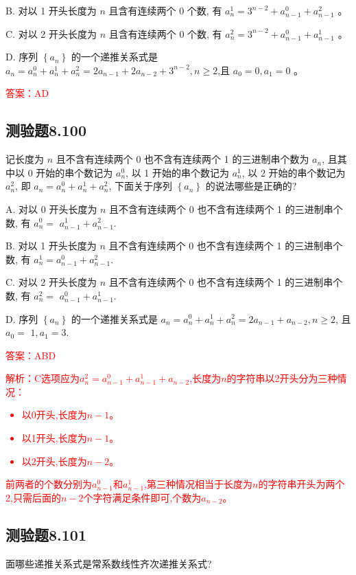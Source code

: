 \documentclass[UTF8, heading=true]{ctexart}
\begin{document}
B. 对以 1 开头长度为 $n$ 且含有连续两个 0 个数, 有 $a_n^1=3^{n-2}+a_{n-1}^0+a_{n-1}^2$ 。

C. 对以 2 开头长度为 $n$ 且含有连续两个 0 个数, 有 $a_n^2=3^{n-2}+a_{n-1}^0+a_{n-1}^1$ 。

D. 序列 $\left\{a_n\right\}$ 的一个递推关系式是 $a_n=a_n^0+a_n^1+a_n^2=2 a_{n-1}+2 a_{n-2}+3^{n-2}, n \geq 2$,且 $a_0=0, a_1=0$ 。


\textcolor{red}{答案：AD}

\subsection{测验题8.100}

记长度为 $n$ 且不含有连续两个 0 也不含有连续两个 1 的三进制串个数为 $a_n$, 且其中以 0 开始的串个数记为 $a_n^0$, 以 1 开始的串个数记为 $a_n^1$, 以 2 开始的串个数记为 $a_n^2$, 即 $a_n=a_n^0+a_n^1+a_n^2$, 下面关于序列 $\left\{a_n\right\}$ 的说法哪些是正确的?

A. 
对以 0 开头长度为 $n$ 且不含有连续两个 0 也不含有连续两个 1 的三进制串个数, 有 $a_n^0=$ $a_{n-1}^1+a_{n-1}^2$.

B. 对以 1 开头长度为 $n$ 且不含有连续两个 0 也不含有连续两个 1 的三进制串个数, 有 $a_n^1=a_{n-1}^0+a_{n-1}^2$.

C. 对以 2 开头长度为 $n$ 且不含有连续两个 0 也不含有连续两个 1 的三进制串个数, 有 $a_n^2=$ $a_{n-1}^0+a_{n-1}^1$.

D. 序列 $\left\{a_n\right\}$ 的一个递推关系式是 $a_n=a_n^0+a_n^1+a_n^2=2 a_{n-1}+a_{n-2}, n \geq 2$, 且 $a_0=$ $1, a_1=3$.

\textcolor{red}{答案：ABD}

\textcolor{red}{解析：C选项应为$a_n^2=a_{n-1}^0+a_{n-1}^1+a_{n-2}$,长度为$n$的字符串以2开头分为三种情况：
\begin{itemize}
  \item 以0开头,长度为$n-1$。
  \item 以1开头,长度为$n-1$。
  \item 以2开头,长度为$n-2$。
\end{itemize}
前两者的个数分别为$a_{n-1}^0$和$a_{n-1}^1$,第三种情况相当于长度为$n$的字符串开头为两个2,只需后面的$n-2$个字符满足条件即可,个数为$a_{n-2}$。
}

\subsection{测验题8.101}

面哪些递推关系式是常系数线性齐次递推关系式?
\end{document}
